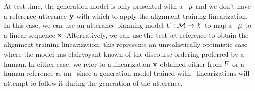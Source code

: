 At test time, the generation model is only
presented with a \meaningrepresentation~$\mu$ and we don't have a reference 
utterance $\mathbf{y}$ with which to apply the alignment training 
linearization. In this case,
we can use an utterance planning model $U : \mathcal{M} \rightarrow \mathcal{X}$ to map a \meaningrepresentation~$\mu$ to a
linear sequence $\mathbf{x}$. Alternatively, we can use the test set reference
to obtain the alignment training linearization; this represents an unrealistically
optimistic case where the model has clairvoyant known of the discourse
ordering preferred by a human.
%
In either case, we refer to 
a linearization $\mathbf{x}$ obtained either from $U$ or a human reference
as an \utteranceplan~since a generation model trained with
\alignmenttraining~linearizations will attempt to follow it during 
the generation of the utterance.


